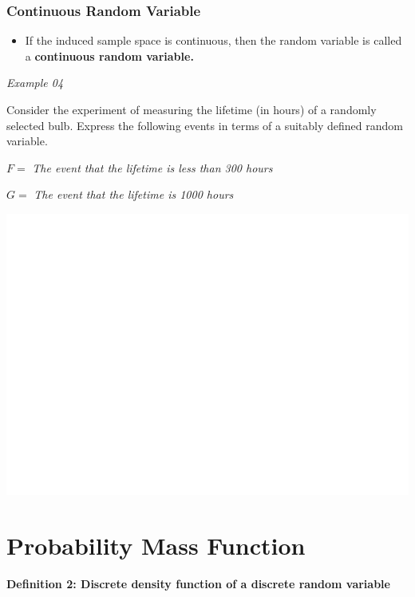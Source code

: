 \documentclass[]{book}
\providecommand{\tightlist}{%
  \setlength{\itemsep}{0pt}\setlength{\parskip}{0pt}}
\begin{document}
\hypertarget{continuous-random-variable}{%
\subsubsection{Continuous Random Variable}\label{continuous-random-variable}}

\begin{itemize}
\tightlist
\item
  If the induced sample space is continuous, then the random variable is called a \textbf{continuous random variable.}
\end{itemize}

\emph{Example 04}

Consider the experiment of measuring the lifetime (in hours) of a randomly selected bulb. Express the following events in terms of a suitably defined random variable.

\(F=\) \emph{The event that the lifetime is less than 300 hours}

\(G=\) \emph{The event that the lifetime is 1000 hours}

\begin{center}\includegraphics[width=1\linewidth]{figure/Ch1box4-1} \end{center}

\hypertarget{probability-mass-function}{%
\section{Probability Mass Function}\label{probability-mass-function}}

\label{sec:pmf}

\textbf{Definition 2: Discrete density function of a discrete random variable}
\end{document}
